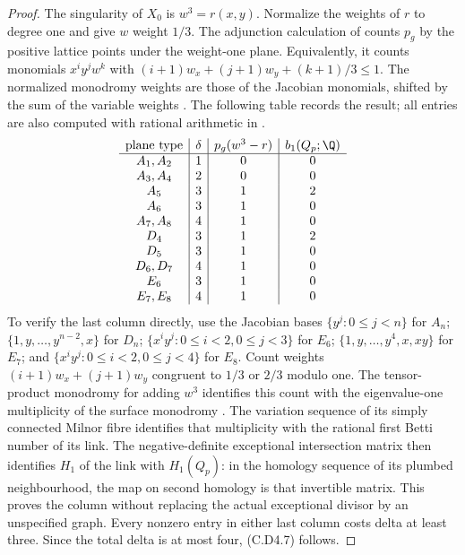 \begin{proof}
The singularity of $X_0$ is $w^3=r(x,y)$. Normalize the
weights of $r$ to degree one and give $w$ weight $1/3$.
The adjunction calculation of
\cite[Theorem 2.1.1 and Corollary 2.1.3]{MerleTeissier1977}
counts $p_g$ by the positive lattice points under the
weight-one plane. Equivalently, it counts monomials
$x^iy^jw^k$ with
$(i+1)w_x+(j+1)w_y+(k+1)/3\le1$.
The normalized monodromy weights are those of the Jacobian
monomials, shifted by the sum of the variable weights
\cite[pp. 165--167]{Steenbrink1989Spectrum}.
The following table records the result; all entries are
also computed with rational arithmetic in
.
\[
\begin{array}{c|c|c|c}
 \hbox{plane type}&\delta&p_g(w^3-r)&b_1(Q_p;\Q)\\ \hline
 A_1,A_2&1&0&0\\
 A_3,A_4&2&0&0\\
 A_5&3&1&2\\
 A_6&3&1&0\\
 A_7,A_8&4&1&0\\
 D_4&3&1&2\\
 D_5&3&1&0\\
 D_6,D_7&4&1&0\\
 E_6&3&1&0\\
 E_7,E_8&4&1&0
\end{array}
\]
To verify the last column directly, use the Jacobian bases
$\{y^j:0\le j<n\}$ for $A_n$;
$\{1,y,\ldots,y^{n-2},x\}$ for $D_n$;
$\{x^iy^j:0\le i<2,0\le j<3\}$ for $E_6$;
$\{1,y,\ldots,y^4,x,xy\}$ for $E_7$; and
$\{x^iy^j:0\le i<2,0\le j<4\}$ for $E_8$.
Count weights $(i+1)w_x+(j+1)w_y$ congruent to $1/3$ or
$2/3$ modulo one. The tensor-product monodromy for adding
$w^3$ identifies this count with the eigenvalue-one
multiplicity of the surface monodromy
\cite[\S1 and Example 2.4(a)]{Nemethi1991Join}.
The variation sequence of its simply connected Milnor fibre
identifies that multiplicity with the rational first Betti
number of its link. The negative-definite exceptional
intersection matrix then identifies $H_1$ of the link with
$H_1(Q_p)$: in the homology sequence of its plumbed
neighbourhood, the map on second homology is that invertible
matrix. This proves the column without replacing the actual
exceptional divisor by an unspecified graph.
Every nonzero entry in either last column costs delta at
least three. Since the total delta is at most four,
(C.D4.7) follows.


\end{proof}
